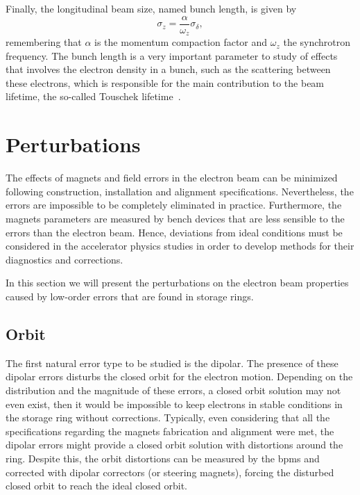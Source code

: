 Finally, the longitudinal beam size, named bunch length, is given by
\begin{equation}
    \sigma_{z} = \dfrac{\alpha}{\omega_z} \sigma_{\delta},
\end{equation}
remembering that $\alpha$ is the momentum compaction factor and $\omega_z$ the synchrotron frequency. The bunch length is a very important parameter to study of effects that involves the electron density in a bunch, such as the scattering between these electrons, which is responsible for the main contribution to the beam lifetime, the so-called Touschek lifetime~\cite{touschek}.
\section{Perturbations}\label{perturbations}
The effects of magnets and field errors in the electron beam can be minimized following construction, installation and alignment specifications. Nevertheless, the errors are impossible to be completely eliminated in practice. Furthermore, the magnets parameters are measured by bench devices that are less sensible to the errors than the electron beam. Hence, deviations from ideal conditions must be considered in the accelerator physics studies in order to develop methods for their diagnostics and corrections.

In this section we will present the perturbations on the electron beam properties caused by low-order errors that are found in storage rings. 
\subsection{Orbit}\label{subset:orbit}
The first natural error type to be studied is the dipolar. The presence of these dipolar errors disturbs the closed orbit for the electron motion. Depending on the distribution and the magnitude of these errors, a closed orbit solution may not even exist, then it would be impossible to keep electrons in stable conditions in the storage ring without corrections. Typically, even considering that all the specifications regarding the magnets fabrication and alignment were met, the dipolar errors might provide a closed orbit solution with distortions around the ring. Despite this, the orbit distortions can be measured by the \gls{bpm}s and corrected with dipolar correctors (or steering magnets), forcing the disturbed closed orbit to reach the ideal closed orbit.

